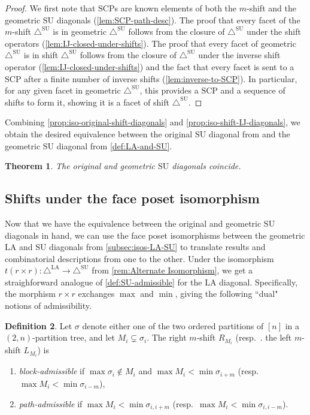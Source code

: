 \documentclass{amsart}
\newcommand{\darkblue}{\color{darkblue}} %
\newcommand{\Kurt}[1]{\todo[color=orange!30]{\rm #1 \\ \hfill --- K.}}
\newtheorem{theorem}{Theorem}[section]
\theoremstyle{definition}
\newtheorem{definition}[theorem]{Definition}
\newcommand{\resp}{resp.~} %
\newcommand{\defn}[1]{\textsl{\darkblue #1}} %
\newcommand{\SU}{\mathrm{SU}}
\newcommand{\LA}{\mathrm{LA}}
\newcommand{\SUD}{\triangle^{\mathrm{SU}}}
\newcommand{\LAD}{\triangle^{\mathrm{LA}}}
\newcommand{\SCP}{\mathrm{SCP}}
\begin{document}
\begin{proof}
We first note that $\SCP$s are known elements of both the $m$-shift and the geometric $\SU$ diagonals (\cref{lem:SCP-path-desc}).
The proof that every facet of the $m$-shift $\SUD$ is in geometric $\SUD$ follows from the closure of $\SUD$ under the shift operators (\cref{lem:IJ-closed-under-shifts}).
The proof that every facet of geometric $\SUD$ is in shift $\SUD$ follows from the closure of $\SUD$ under the inverse shift operator (\cref{lem:IJ-closed-under-shifts}) and the fact that every facet is sent to a $\SCP$ after a finite number of inverse shifts (\cref{lem:inverse-to-SCP}).
In particular, for any given facet in geometric $\SUD$, this provides a $\SCP$ and a sequence of shifts to form it, showing it is a facet of shift $\SUD$.
\end{proof}

Combining \cref{prop:iso-original-shift-diagonals} and \cref{prop:iso-shift-IJ-diagonals}, we obtain the desired equivalence between the original $\SU$ diagonal from \cite{SaneblidzeUmble} and the geometric $\SU$ diagonal from \cref{def:LA-and-SU}.

\begin{theorem}
\label{thm:recover-SU}
The original and geometric $\SU$ diagonals coincide.
\end{theorem}

\Kurt{Finished proof reading to here.}


\subsection{Shifts under the face poset isomorphism}
\label{subsec:shifts-under-iso}

Now that we have the equivalence between the original and geometric $\SU$ diagonals in hand, we can use the face poset isomorphisms between the geometric $\LA$ and $\SU$ diagonals from \cref{subsec:isos-LA-SU} to translate results and combinatorial descriptions from one to the other. 
Under the isomorphism $t(r\times r):\LAD\to\SUD$ from \cref{rem:Alternate Isomorphism}, we get a straighforward analogue of \cref{def:SU-admissible} for the $\LA$ diagonal.
Specifically, the morphism $r \times r$ exchanges $\max$ and $\min$, giving the following ``dual" notions of admissibility.

\begin{definition}
\label{def:LA-admissible}
Let $\sigma$ denote either one of the two ordered partitions of $[n]$ in a $(2,n)$-partition tree, and let $M_i \subsetneq \sigma_i$.
The right $m$-shift $R_{M_i}$ (\resp. the left $m$-shift $L_{M_{i}}$) is 
\begin{enumerate}
	\item \defn{block-admissible} if $\max \sigma_i \notin M_i$ and $\max M_i < \min \sigma_{i+m}$ (\resp $\max M_{i} < \min \sigma_{i-m}$),
	\item \defn{path-admissible} if $\max M_i< \min \sigma_{i,i+m}$ (\resp $\max M_{i} < \min \sigma_{i,i-m}$).
\end{enumerate}
\end{definition}
\end{document}
